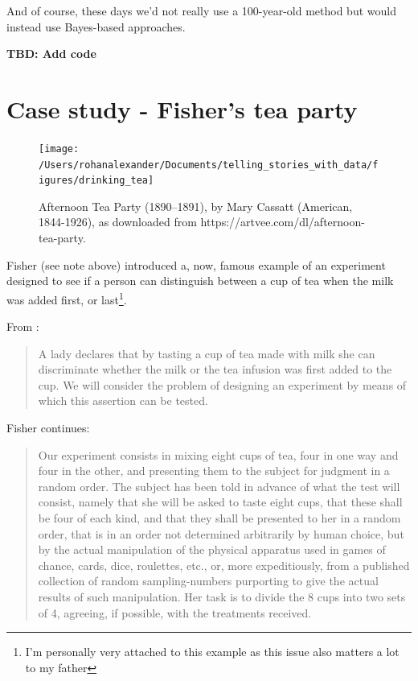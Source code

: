 \documentclass[
]{book}
\begin{document}
And of course, these days we'd not really use a 100-year-old method but would instead use Bayes-based approaches.

\textbf{TBD: Add code}

\hypertarget{case-study---fishers-tea-party}{%
\section{Case study - Fisher's tea party}\label{case-study---fishers-tea-party}}

\begin{figure}
\texttt{[image: /Users/rohanalexander/Documents/telling\_stories\_with\_data/figures/drinking\_tea]} \caption{Afternoon Tea Party (1890–1891), by Mary Cassatt (American, 1844-1926), as downloaded from https://artvee.com/dl/afternoon-tea-party.}\label{fig:ladiesdrinkingtea}
\end{figure}

Fisher (see note above) introduced a, now, famous example of an experiment designed to see if a person can distinguish between a cup of tea when the milk was added first, or last\footnote{I'm personally very attached to this example as this issue also matters a lot to my father}.

From \citet[p.13]{fisherdesignofexperiments}:

\begin{quote}
A lady declares that by tasting a cup of tea made with milk she can discriminate whether the milk or the tea infusion was first added to the cup. We will consider the problem of designing an experiment by means of which this assertion can be tested.
\end{quote}

Fisher continues:

\begin{quote}
Our experiment consists in mixing eight cups of tea, four in one way and four in the other, and presenting them to the subject for judgment in a random order. The subject has been told in advance of what the test will consist, namely that she will be asked to taste eight cups, that these shall be four of each kind, and that they shall be presented to her in a random order, that is in an order not determined arbitrarily by human choice, but by the actual manipulation of the physical apparatus used in games of chance, cards, dice, roulettes, etc., or, more expeditiously, from a published collection of random sampling-numbers purporting to give the actual results of such manipulation. Her task is to divide the 8 cups into two sets of 4, agreeing, if possible, with the treatments received.
\end{quote}
\end{document}
